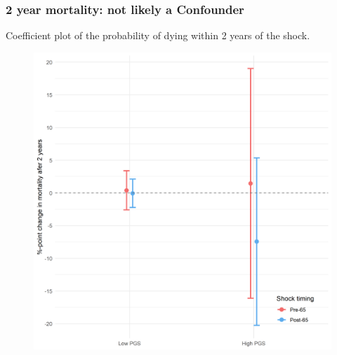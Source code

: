 \documentclass[10pt,compress,xcolor=dvipsnames]{beamer}    %
\newcounter{ex}
\newcommand{\1}[1]{\mathrm{1\hspace*{-2.5pt}l}[#1]}	%
\begin{document}
\begin{frame}
\frametitle{2 year mortality: not likely a Confounder}
Coefficient plot of the probability of dying within 2 years of the shock.
\begin{figure}[hbtp]
\centering
\includegraphics[height=0.8\textheight]{../../3_output/shock_effects/dead2_6070_100_cvplot.png}
\label{fig:dead2}
\end{figure}
\end{frame}
\end{document}
